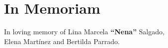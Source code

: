\section*{In Memoriam}
\begin{flushright}
{\large In loving memory of Lina Marcela {\bf ``Nena''} Salgado,\\
Elena Martínez and Bertilda Parrado.}
\end{flushright}
